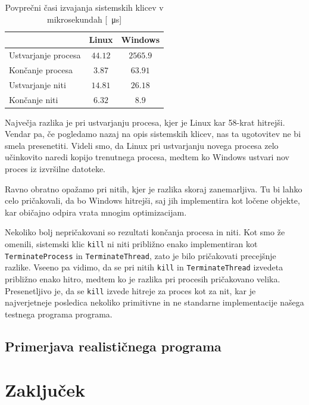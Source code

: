 \documentclass[a4paper,12pt,openright]{book}
\begin{document}
\begin{table}[h!]
	\begin{center}
		\begin{tabular}{ l|c|c }
			                    & Linux   & Windows  \\
			\hline
			Ustvarjanje procesa & $44.12$ & $2565.9$ \\
			Končanje procesa   & $3.87$  & $63.91$  \\
			Ustvarjanje niti    & $14.81$ & $26.18$  \\
			Končanje niti      & $6.32$  & $8.9$    \\
		\end{tabular}
	\end{center}
	\caption{Povprečni časi izvajanja sistemskih klicev v mikrosekundah [\SI{}{\micro\second}]}
	\label{tab:ex1:times}
\end{table}

Največja razlika je pri ustvarjanju procesa, kjer je Linux kar 58-krat hitrejši.
Vendar pa, če pogledamo nazaj na opis sistemskih klicev, nas ta ugotovitev ne bi smela presenetiti.
Videli smo, da Linux pri ustvarjanju novega procesa zelo učinkovito naredi kopijo trenutnega procesa, medtem ko Windows ustvari nov proces iz izvršilne datoteke.

Ravno obratno opažamo pri nitih, kjer je razlika skoraj zanemarljiva.
Tu bi lahko celo pričakovali, da bo Windows hitrejši, saj jih implementira kot ločene objekte, kar običajno odpira vrata mnogim optimizacijam.

Nekoliko bolj nepričakovani so rezultati končanja procesa in niti.
Kot smo že omenili, sistemski klic \texttt{kill} ni niti približno enako implementiran kot \texttt{TerminateProcess} in \texttt{TerminateThread}, zato je bilo pričakovati precejšnje razlike.
Vseeno pa vidimo, da se pri nitih \texttt{kill} in \texttt{TerminateThread} izvedeta približno enako hitro, medtem ko je razlika pri procesih pričakovano velika.
Presenetljivo je, da se \texttt{kill} izvede hitreje za proces kot za nit, kar je najverjetneje posledica nekoliko primitivne in ne standarne implementacije našega testnega programa programa.

\section{Primerjava realističnega programa}

\chapter{Zaključek}


\printbibliography[heading=bibintoc,title={Literatura}]
\end{document}
